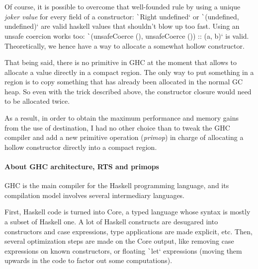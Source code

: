 \documentclass[english]{jflart}
\begin{document}
Of course, it is possible to overcome that well-founded rule by using a unique \emph{joker value} for every field of a constructor: \texttt`Right undefined` or \texttt`(undefined, undefined)` are valid haskell values that shouldn't blow up too fast. Using an unsafe coercion works too: \texttt`(unsafeCoerce (), unsafeCoerce ()) :: (a, b)` is valid. Theoretically, we hence have a way to allocate a somewhat hollow constructor.

That being said, there is no primitive in GHC at the moment that allows to allocate a value directly in a compact region. The only way to put something in a region is to copy something that has already been allocated in the normal GC heap. So even with the trick described above, the constructor closure would need to be allocated twice.

As a result, in order to obtain the maximum performance and memory gains from the use of destination, I had no other choice than to tweak the GHC compiler and add a new primitive operation (\emph{primop}) in charge of allocating a hollow constructor directly into a compact region.

\paragraph{About GHC architecture, RTS and primops}

GHC is the main compiler for the Haskell programming language, and its compilation model involves several intermediary languages.

First, Haskell code is turned into Core, a typed language whose syntax is mostly a subset of Haskell one. A lot of Haskell constructs are desugared into constructors and case expressions, type applications are made explicit, etc.
Then, several optimization steps are made on the Core output, like removing case expressions on known constructors, or floating \texttt`let` expressions (moving them upwards in the code to factor out some computations).
\end{document}
